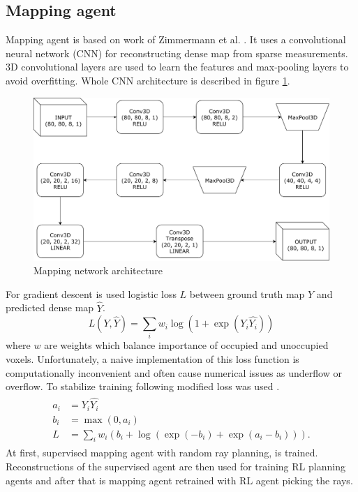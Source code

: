 \subsection{Mapping agent}
Mapping agent is based on work of Zimmermann et al. \cite{zimmermann2017}. It uses a convolutional neural network (CNN) for reconstructing dense map from sparse measurements. 3D convolutional layers are used to learn the features and max-pooling layers to avoid overfitting. Whole CNN architecture is described in figure \ref{fig:supervised}.
\vspace{3mm}
\begin{figure}[!h]
\centering
\includegraphics[scale=0.6]{fig/supervised.pdf}
\caption{Mapping network architecture}
\label{fig:supervised}
\end{figure}

For gradient descent is used logistic loss $L$ between ground truth map $Y$ and predicted dense map $\hat{Y}$.
\begin{equation} \label{eq:loglos}
L(Y, \hat{Y}) = \sum\limits_i w_i \log(1 + \exp(Y_i \hat{Y_i}))
\end{equation}
where $w$ are weights which balance importance of occupied and unoccupied voxels.
\pagebreak
Unfortunately, a naive implementation of this loss function is computationally inconvenient and often cause numerical issues as underflow or overflow. To stabilize training following modified loss was used \cite{matconvnet2015}.
\begin{align} 
\begin{split}
a_i &= Y_i \hat{Y_i} \\
b_i &= \max(0, a_i) \\
L &= \sum\limits_i w_i (b_i + \log(\exp(-b_i) + \exp(a_i-b_i))).
\end{split}
\end{align}
At first, supervised mapping agent with random ray planning, is trained. Reconstructions of the supervised agent are then used for training RL planning agents and after that is mapping agent retrained with RL agent picking the rays.
